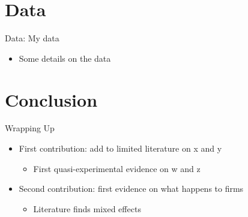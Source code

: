 \documentclass[10pt,
			   handout
			   ]{beamer}
\begin{document}
\section{Data}

\begin{frame}{Data: My data}
    \begin{itemize}
        \item Some details on the data
    \end{itemize}
\end{frame}

\section{Conclusion}

\begin{frame}{Wrapping Up}
    \begin{itemize}
        \item First contribution: add to limited literature on x and y
        \begin{itemize}[<+->]
	        \item First quasi-experimental evidence on w and z
	    \end{itemize}
	    \pause
	    \item Second contribution: first evidence on what happens to firms 
	    \begin{itemize}
	    	\item Literature finds mixed effects 
	    \end{itemize}
    \end{itemize}
\end{frame}
\end{document}
